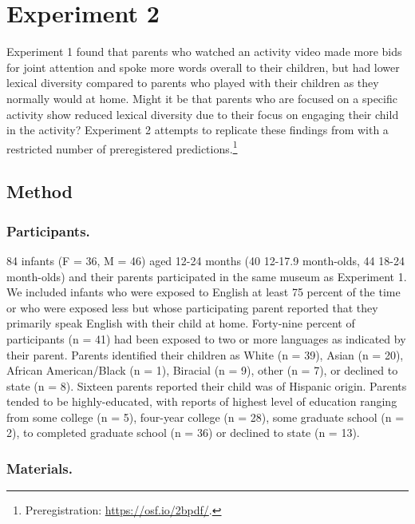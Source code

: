 \documentclass[man,floatsintext]{apa6}
\let\rmarkdownfootnote\footnote%
\def\footnote{\protect\rmarkdownfootnote}
\begin{document}
\hypertarget{experiment-2}{%
\section{Experiment 2}\label{experiment-2}}

Experiment 1 found that parents who watched an activity video made more bids for joint attention and spoke more words overall to their children, but had lower lexical diversity compared to parents who played with their children as they normally would at home.
Might it be that parents who are focused on a specific activity show reduced lexical diversity due to their focus on engaging their child in the activity?
Experiment 2 attempts to replicate these findings from with a restricted number of preregistered predictions.\footnote{Preregistration: \url{https://osf.io/2bpdf/}.}

\hypertarget{method-1}{%
\subsection{Method}\label{method-1}}

\hypertarget{participants.-1}{%
\subsubsection{Participants.}\label{participants.-1}}

84 infants (F = 36, M = 46) aged 12-24 months (40 12-17.9 month-olds, 44 18-24 month-olds) and their parents participated in the same museum as Experiment 1.
We included infants who were exposed to English at least 75 percent of the time or who were exposed less but whose participating parent reported that they primarily speak English with their child at home.
Forty-nine percent of participants (n = 41) had been exposed to two or more languages as indicated by their parent.
Parents identified their children as White (n = 39), Asian (n = 20), African American/Black (n = 1), Biracial (n = 9), other (n = 7), or declined to state (n = 8).
Sixteen parents reported their child was of Hispanic origin.
Parents tended to be highly-educated, with reports of highest level of education ranging from some college (n = 5), four-year college (n = 28), some graduate school (n = 2), to completed graduate school (n = 36) or declined to state (n = 13).

\hypertarget{materials.-1}{%
\subsubsection{Materials.}\label{materials.-1}}
\end{document}

